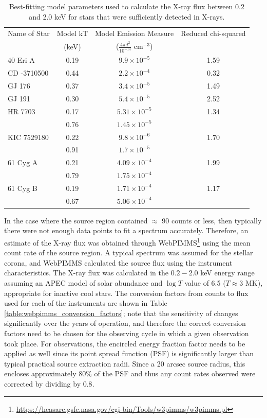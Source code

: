 \begin{table}[h]
\centering
\caption[X-ray spectral modelling results]{Best-fitting model parameters used to calculate the X-ray flux between 0.2 and 2.0 keV for stars that were sufficiently detected in X-rays.}
\begin{tabular}{l c c c}
	\hline \hline
	Name of Star & Model kT & Model Emission Measure  & Reduced chi-squared\\
    & (keV)          &($\frac{4\pi d^2}{10^{-14}}$ cm$^{-3}$) & \\
	\hline
	40 Eri A & 0.19 & $9.9\times 10^{-5}$ & 1.59\\
	CD -3710500 & 0.44 & $2.2\times 10^{-4}$ & 0.32\\
	GJ 176 & 0.37 & $3.4\times 10^{-5}$ & 1.49\\
	GJ 191 & 0.30 & $5.4\times 10^{-5}$ & 2.52\\
	HR 7703 & 0.17 & $5.31\times 10^{-5}$ & 1.34\\
	& 0.76 & $1.45\times 10^{-5}$  &\\
	KIC 7529180 & 0.22 & $9.8\times 10^{-6}$ & 1.70\\
	& 0.91 & $1.7\times 10^{-5}$  &\\
	61 Cyg A & 0.21 & $4.09\times 10^{-4}$ & 1.99\\
	& 0.79 & $1.75\times 10^{-4}$  &\\
	61 Cyg B & 0.19 & $1.71\times 10^{-4}$ & 1.17\\
	& 0.67 & $5.06\times 10^{-4}$  &\\
	\hline
	\end{tabular}
	\label{table:spectral_fit_details}
\end{table}

In the case where the source region contained $\approx$ 90 counts or less, then typically there were not enough data points to fit a spectrum accurately. Therefore, an estimate of the X-ray flux was obtained through WebPIMMS\footnote{\url{https://heasarc.gsfc.nasa.gov/cgi-bin/Tools/w3pimms/w3pimms.pl}} using the mean count rate of the source region. A typical spectrum was assumed for the stellar corona, and WebPIMMS calculated the source flux using the instrument characteristics. The X-ray flux was calculated in the $0.2 - 2.0$ keV energy range assuming an APEC model of solar abundance and $\log T$ value of 6.5 ($T \approx 3$ MK), appropriate for inactive cool stars. The conversion factors from counts to flux used for each of the instruments are shown in Table \ref{table:webpimms_conversion_factors}; note that the sensitivity of \Chandra changes significantly over the years of operation, and therefore the correct conversion factors need to be chosen for the observing cycle in which a given observation took place. For \XMM observations, the encircled energy fraction factor needs to be applied as well since its point spread function (PSF) is significantly larger than typical practical source extraction radii. Since a 20 arcsec source radius, this encloses approximately 80\% of the PSF and thus any count rates observed were corrected by dividing by $0.8$.

